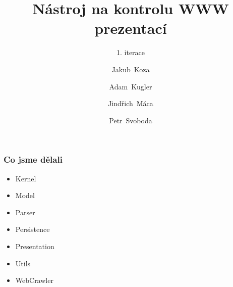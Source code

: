 \documentclass{beamer}
\begin{document}
\title [NKWP]{Nástroj na kontrolu WWW prezentací}
\author[J.~ Koza, A.~ Kugler, J.~Máca, P.~Svoboda]{Jakub~Koza \and Adam~Kugler \and Jindřich~Máca \and Petr~Svoboda}

\subtitle{1. iterace}
\frame{\titlepage}
\begin{frame}[allowframebreaks]\frametitle{Co jsme dělali}
   \begin{itemize}
    \item Kernel
		\item Model
		\item Parser
		\item Persistence
		\item Presentation
		\item Utils
		\item WebCrawler
   \end{itemize}
\end{frame}
\end{document}
